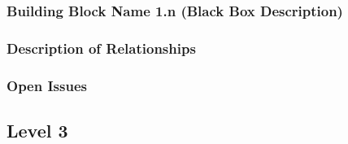 \subsubsection{Building Block Name 1.n (Black Box Description)}

\subsubsection{Description of Relationships}

\subsubsection{Open Issues}


\subsection{Level 3}

